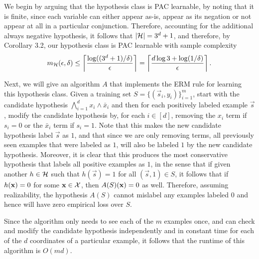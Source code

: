 \begin{ex}
  We begin by arguing that the hypothesis class is PAC learnable, by noting that
  it is finite, since each variable can either appear as-is, appear as its
  negation or not appear at all in a particular conjunction. Therefore,
  accounting for the additional always negative hypothesis, it follows that
  $|\mathcal{H}|=3^d+1$, and therefore, by Corollary 3.2, our hypothesis class is PAC
  learnable with sample complexity
  \[
    m_{\mathcal{H}}(\epsilon,\delta)\leq
    \left\lceil\frac{\log((3^d+1)/\delta)}{\epsilon}\right\rceil
    =\left\lceil\frac{d\log{3}+\log(1/\delta)}{\epsilon}\right\rceil.
  \]

  Next, we will give an algorithm $A$ that implements the ERM rule for learning
  this hypothesis class. Given a training set $S=\{(\vec{s}_i, y_i)\}_{i=1}^m$,
  start with the candidate hypothesis
  $\bigwedge_{i=1}^d x_i\wedge \bar{x}_i$ and then for each positively labeled
  example $\vec{s}$, modify the candidate hypothesis by, for each $i\in[d]$,
  removing the $x_i$ term if $s_i=0$ or the $\bar{x}_i$ term if $s_i=1$.
  Note that this makes the new candidate hypothesis label $\vec{s}$ as
  $1$, and that since we are only removing terms, all previously seen examples
  that were labeled as $1$, will also be labeled $1$ by the new
  candidate hypothesis. Moreover, it is clear that this produces the most
  conservative hypothesis that labels all positive examples as $1$, in the sense
  that if given another $h\in \mathcal{H}$ such that $h(\vec{s})=1$ for all
  $(\vec{s},1)\in S$, it follows that if $h(\mathbf{x})=0$ for some $\mathbf{x}\in\mathcal{X}$, then
  $A(S)(\mathbf{x})=0$ as well. Therefore, assuming realizability, the hypothesis $A(S)$
  cannot mislabel any examples labeled $0$ and hence will have zero empirical
  loss over $S$.

  Since the algorithm only needs to see each of the $m$ examples once, and can
  check and modify the candidate hypothesis independently and in constant time
  for each of the $d$ coordinates of a particular example, it follows that the
  runtime of this algorithm is $O(md)$.
\end{ex}

\begin{ex}
\end{ex}

\begin{ex}
\end{ex}

\begin{ex}
\end{ex}

\begin{ex}
\end{ex}

\begin{ex}
\end{ex}
